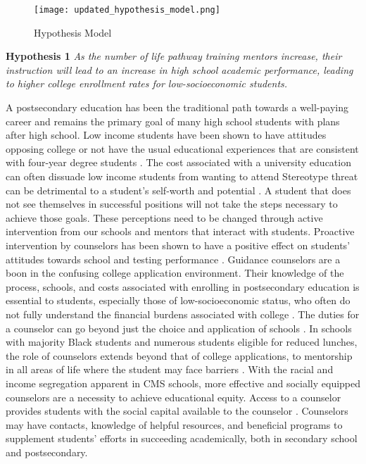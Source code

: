 \begin{figure}
    \caption{Hypothesis Model}
    \texttt{[image: updated\_hypothesis\_model.png]}
    \label{fig3}
\end{figure}


\textbf{Hypothesis 1} \textit{As the number of life pathway training mentors increase, their instruction will lead to an increase in high school academic performance, leading to higher college enrollment rates for low-socioeconomic students.}

A postsecondary education has been the traditional path towards a well-paying career and remains the primary goal of many high school students with plans after high school. 
Low income students have been shown to have attitudes opposing college or not have the usual educational experiences that are consistent with four-year degree students \parencite[][]{king1996}. 
The cost associated with a university education can often dissuade low income students from wanting to attend \parencite[][]{king1996}
Stereotype threat can be detrimental to a student's self-worth and potential \parencite[][]{croizet1998}.
A student that does not see themselves in successful positions will not take the steps necessary to achieve those goals. 
These perceptions need to be changed through active intervention from our schools and mentors that interact with students. 
Proactive intervention by counselors has been shown to have a positive effect on students' attitudes towards school  and testing performance \parencite[][]{lee1993}.
Guidance counselors are a boon in the confusing college application environment. 
Their knowledge of the process, schools, and costs associated with enrolling in postsecondary education is essential to students, especially those of low-socioeconomic status, who often do not fully understand the financial burdens associated with college \parencite[][]{castleman2014intensive,deslonde2018high}. 
The duties for a counselor can go beyond just the choice and application of schools \parencite[][]{deslonde2018high}.  
In schools with majority Black students and numerous students eligible for reduced lunches, the role of counselors extends beyond that of college applications, to mentorship in all areas of life where the student may face barriers \parencite[][]{farmer2006}.
With the racial and income segregation apparent in CMS schools, more effective and socially equipped counselors are a necessity to achieve educational equity. 
Access to a counselor provides students with the social capital available to the counselor \parencite{tang2019high}. 
Counselors may have contacts, knowledge of helpful resources, and beneficial programs to supplement students' efforts in succeeding academically, both in secondary school and postsecondary. 


